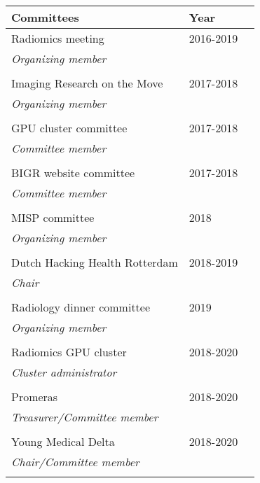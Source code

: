 \vspace*{2cm}
\begin{tabular}{L{8cm}lr}
    \textbf{Committees}&\textbf{Year}\\
    \toprule
    Radiomics meeting& 2016-2019\\
    \textit{Organizing member}\\
    \\
    Imaging Research on the Move& 2017-2018\\
    \textit{Organizing member}\\
    \\
    GPU cluster committee & 2017-2018\\
    \textit{Committee member}\\
    \\
    BIGR website committee & 2017-2018\\
    \textit{Committee member}\\
    \\
    MISP committee & 2018\\
    \textit{Organizing member}\\
    \\
    Dutch Hacking Health Rotterdam & 2018-2019\\
    \textit{Chair}\\
    \\
    Radiology dinner committee & 2019\\
    \textit{Organizing member}\\
    \\
    Radiomics GPU cluster & 2018-2020\\
    \textit{Cluster administrator}\\
    \\
    Promeras & 2018-2020\\
    \textit{Treasurer/Committee member}\\
    \\
    Young Medical Delta & 2018-2020\\
    \textit{Chair/Committee member}\\
    \\
\end{tabular}
